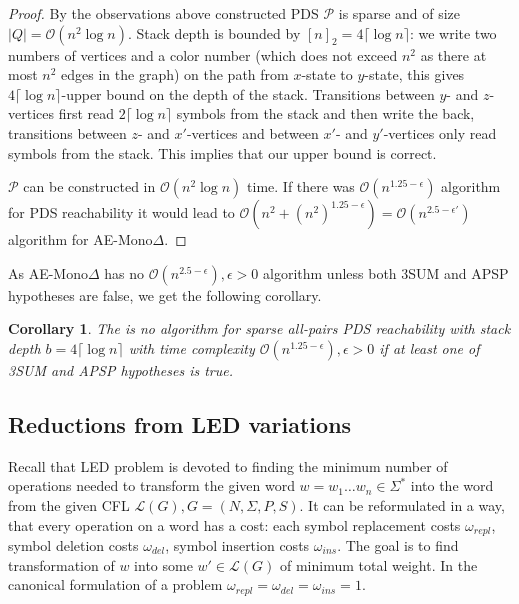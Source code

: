 \documentclass[12pt]{article}
\newtheorem{cor}{Corollary}[section]
\begin{document}
\begin{proof}
By the observations above constructed PDS $\mathcal{P}$ is sparse and of size $|Q| = \mathcal{O}(n^2 \log n)$. Stack depth is bounded by $[n]_2 = 4 \lceil \log n \rceil$: we write two numbers of vertices and a color number (which does not exceed $n^2$ as there at most $n^2$ edges in the graph) on the path from $x$-state to $y$-state, this gives $4 \lceil \log n \rceil$-upper bound on the depth of the stack. Transitions between $y$- and $z$-vertices first read $2  \lceil \log n \rceil$ symbols from the stack and then write the back, transitions between $z$- and $x'$-vertices and between $x'$- and $y'$-vertices only read symbols from the stack. This implies that our upper bound is correct.

$\mathcal{P}$ can be constructed in $\mathcal{O}(n^2 \log n)$ time. If there was $\mathcal{O}(n^{1.25 - \epsilon})$ algorithm for PDS reachability it would lead to $\mathcal{O}(n^{2} + (n^2)^{1.25 - \epsilon}) = \mathcal{O}(n^{2.5 - \epsilon'})$ algorithm for AE-Mono$\Delta$.
\end{proof}

As AE-Mono$\Delta$ has no $ \mathcal{O}(n^{2.5 - \epsilon}), \epsilon > 0$ algorithm unless both 3SUM and APSP hypotheses are false, we get the following corollary.

\begin{cor}
The is no algorithm for sparse all-pairs PDS reachability with stack depth $b = 4 \lceil \log n \rceil$ with time complexity  $\mathcal{O}(n^{1.25 - \epsilon}), \epsilon > 0$ if at least one of 3SUM and APSP hypotheses is true.
\end{cor}

\subsection{Reductions from LED variations}
\label{subsec:led}

Recall that LED problem is devoted to finding the minimum number of operations needed to transform the given word $w = w_1 \ldots w_n \in \Sigma^*$ into the word from the given CFL $\mathcal{L}(G), G = (N, \Sigma, P, S)$. It can be reformulated in a way, that every operation on a word has a cost: each symbol replacement costs $\omega_{repl}$, symbol deletion costs $\omega_{del}$, symbol insertion costs $\omega_{ins}$. The goal is to find transformation of $w$ into some $w' \in \mathcal{L}(G)$ of minimum total weight. In the canonical formulation of a problem $\omega_{repl} = \omega_{del} = \omega_{ins} = 1$.
\end{document}
